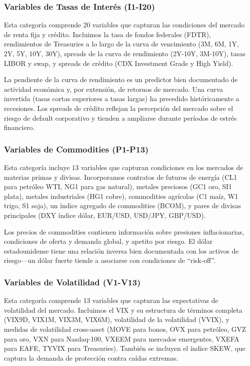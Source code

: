 \documentclass[11pt,a4paper]{article}
\begin{document}
\subsubsection{Variables de Tasas de Interés (I1-I20)}

Esta categoría comprende 20 variables que capturan las condiciones del mercado de renta fija y crédito. Incluimos la tasa de fondos federales (FDTR), rendimientos de Treasuries a lo largo de la curva de vencimiento (3M, 6M, 1Y, 2Y, 5Y, 10Y, 30Y), spreads de la curva de rendimiento (2Y-10Y, 3M-10Y), tasas LIBOR y swap, y spreads de crédito (CDX Investment Grade y High Yield).

La pendiente de la curva de rendimiento es un predictor bien documentado de actividad económica y, por extensión, de retornos de mercado. Una curva invertida (tasas cortas superiores a tasas largas) ha precedido históricamente a recesiones. Los spreads de crédito reflejan la percepción del mercado sobre el riesgo de default corporativo y tienden a ampliarse durante períodos de estrés financiero.

\subsubsection{Variables de Commodities (P1-P13)}

Esta categoría incluye 13 variables que capturan condiciones en los mercados de materias primas y divisas. Incorporamos contratos de futuros de energía (CL1 para petróleo WTI, NG1 para gas natural), metales preciosos (GC1 oro, SI1 plata), metales industriales (HG1 cobre), commodities agrícolas (C1 maíz, W1 trigo, S1 soja), un índice agregado de commodities (BCOM), y pares de divisas principales (DXY índice dólar, EUR/USD, USD/JPY, GBP/USD).

Los precios de commodities contienen información sobre presiones inflacionarias, condiciones de oferta y demanda global, y apetito por riesgo. El dólar estadounidense tiene una relación inversa bien documentada con los activos de riesgo---un dólar fuerte tiende a asociarse con condiciones de ``risk-off''.

\subsubsection{Variables de Volatilidad (V1-V13)}

Esta categoría comprende 13 variables que capturan las expectativas de volatilidad del mercado. Incluimos el VIX y su estructura de términos completa (VIX9D, VIX1M, VIX3M, VIX6M), volatilidad de la volatilidad (VVIX), y medidas de volatilidad cross-asset (MOVE para bonos, OVX para petróleo, GVZ para oro, VXN para Nasdaq-100, VXEEM para mercados emergentes, VXEFA para EAFE, TYVIX para Treasuries). También se incluyen el índice SKEW, que captura la demanda de protección contra caídas extremas.
\end{document}
